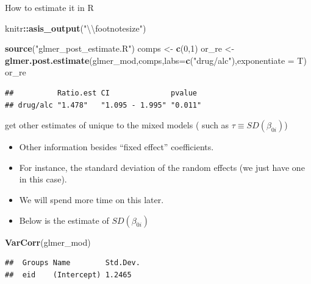 \documentclass[ignorenonframetext,]{beamer}
\newenvironment{Shaded}{\begin{snugshade}}{\end{snugshade}}
\newcommand{\KeywordTok}[1]{\textcolor[rgb]{0.13,0.29,0.53}{\textbf{#1}}}
\newcommand{\DataTypeTok}[1]{\textcolor[rgb]{0.13,0.29,0.53}{#1}}
\newcommand{\DecValTok}[1]{\textcolor[rgb]{0.00,0.00,0.81}{#1}}
\newcommand{\CharTok}[1]{\textcolor[rgb]{0.31,0.60,0.02}{#1}}
\newcommand{\StringTok}[1]{\textcolor[rgb]{0.31,0.60,0.02}{#1}}
\newcommand{\OperatorTok}[1]{\textcolor[rgb]{0.81,0.36,0.00}{\textbf{#1}}}
\newcommand{\NormalTok}[1]{#1}
\providecommand{\tightlist}{%
  \setlength{\itemsep}{0pt}\setlength{\parskip}{0pt}}
\begin{document}
\begin{frame}[fragile]{How to estimate it in R}
\begin{Shaded}
\begin{Highlighting}[]
\NormalTok{knitr}\OperatorTok{::}\KeywordTok{asis_output}\NormalTok{(}\StringTok{"}\CharTok{\textbackslash{}\textbackslash{}}\StringTok{footnotesize"}\NormalTok{)}
\end{Highlighting}
\end{Shaded}

\footnotesize

\begin{Shaded}
\begin{Highlighting}[]
\KeywordTok{source}\NormalTok{(}\StringTok{"glmer_post_estimate.R"}\NormalTok{)}
\NormalTok{comps <-}\StringTok{ }\KeywordTok{c}\NormalTok{(}\DecValTok{0}\NormalTok{,}\DecValTok{1}\NormalTok{)}
\NormalTok{or_re <-}\StringTok{ }\KeywordTok{glmer.post.estimate}\NormalTok{(glmer_mod,comps,}\DataTypeTok{labs=}\KeywordTok{c}\NormalTok{(}\StringTok{"drug/alc"}\NormalTok{),}\DataTypeTok{exponentiate =}\NormalTok{ T)            }
\NormalTok{or_re}
\end{Highlighting}
\end{Shaded}

\begin{verbatim}
##          Ratio.est CI              pvalue 
## drug/alc "1.478"   "1.095 - 1.995" "0.011"
\end{verbatim}

\end{frame}

\begin{frame}[fragile]{get other estimates of unique to the mixed models
( such as \(\tau \equiv SD(\beta_{0i})\))}

\begin{itemize}
\tightlist
\item
  Other information besides ``fixed effect'' coefficients.
\item
  For instance, the standard deviation of the random effects (we just
  have one in this case).\\
\item
  We will spend more time on this later.
\item
  Below is the estimate of \(SD(\beta_{0i})\)
\end{itemize}

\begin{Shaded}
\begin{Highlighting}[]
\KeywordTok{VarCorr}\NormalTok{(glmer_mod)}
\end{Highlighting}
\end{Shaded}

\begin{verbatim}
##  Groups Name        Std.Dev.
##  eid    (Intercept) 1.2465
\end{verbatim}

\end{frame}
\end{document}
